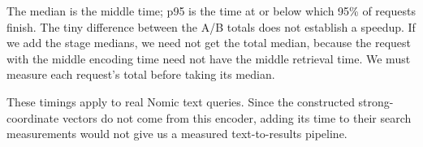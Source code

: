 The median is the middle time; p95 is the time at or below which 95\% of requests finish. The tiny difference
between the A/B totals does not establish a speedup. If we add the stage medians, we need
not get the total median, because the request with the middle encoding time need not have
the middle retrieval time. We must measure each request's total before taking its median.

These timings apply to real Nomic text queries. Since the constructed strong-coordinate
vectors do not come from this encoder, adding its time to their search measurements would
not give us a measured text-to-results pipeline.

